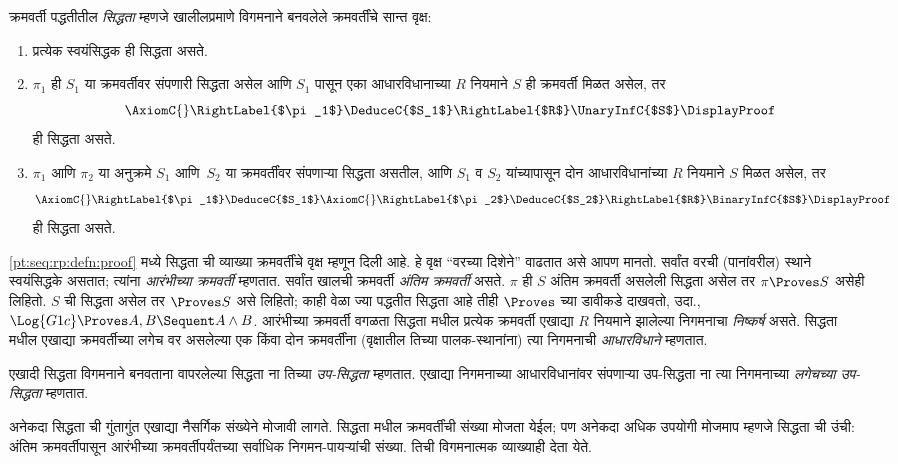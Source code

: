 \begin{defn}\label{pt:seq:rp:defn:proof}
क्रमवर्ती पद्धतीतील \emph{सिद्धता} म्हणजे खालीलप्रमाणे
विगमनाने बनवलेले क्रमवर्तींचे सान्त वृक्ष:
\begin{enumerate}
  \item\label{pt:seq:rp:defn:prf:axiom} प्रत्येक स्वयंसिद्धक ही सिद्धता असते.
  \item\label{pt:seq:rp:defn:prf:one-prem} $\pi_1$ ही $S_1$ या क्रमवर्तीवर
  संपणारी सिद्धता असेल आणि $S_1$ पासून एका आधारविधानाच्या
  $R$ नियमाने $S$ ही क्रमवर्ती मिळत असेल, तर
  \[
  \AxiomC{}
  \RightLabel{$\pi_1$}
  \DeduceC{$S_1$}
  \RightLabel{$R$}
  \UnaryInfC{$S$}
  \DisplayProof
  \]
  ही सिद्धता असते.
  \item\label{pt:seq:rp:defn:prf:two-prem} $\pi_1$ आणि $\pi_2$ या
  अनुक्रमे $S_1$ आणि~$S_2$ या क्रमवर्तींवर संपणाऱ्या सिद्धता
  असतील, आणि $S_1$ व $S_2$ यांच्यापासून दोन आधारविधानांच्या $R$ नियमाने
  $S$ मिळत असेल, तर
  \[
  \AxiomC{}
  \RightLabel{$\pi_1$}
  \DeduceC{$S_1$}
  \AxiomC{}
  \RightLabel{$\pi_2$}
  \DeduceC{$S_2$}
  \RightLabel{$R$}
  \BinaryInfC{$S$}
  \DisplayProof
  \]
  ही सिद्धता असते.
\end{enumerate}
\end{defn}

\ref{pt:seq:rp:defn:proof} मध्ये सिद्धता ची व्याख्या क्रमवर्तींचे वृक्ष म्हणून
दिली आहे. हे वृक्ष ``वरच्या दिशेने'' वाढतात असे आपण मानतो.
सर्वांत वरची (पानांवरील) स्थाने स्वयंसिद्धके असतात; त्यांना
\emph{आरंभीच्या क्रमवर्ती} म्हणतात. सर्वांत खालची क्रमवर्ती
\emph{अंतिम क्रमवर्ती} असते. $\pi$ ही $S$ अंतिम क्रमवर्ती
असलेली सिद्धता असेल तर $\pi \Proves S$ असेही लिहितो.
$S$ ची सिद्धता असेल तर $\Proves S$ असे लिहितो; काही वेळा
ज्या पद्धतीत सिद्धता आहे तीही $\Proves$ च्या डावीकडे दाखवतो,
उदा., $\Log{G1c} \Proves A, B \Sequent A \land
B$. आरंभीच्या क्रमवर्ती वगळता सिद्धता मधील प्रत्येक
क्रमवर्ती एखाद्या $R$ नियमाने झालेल्या निगमनाचा
\emph{निष्कर्ष} असते. सिद्धता मधील एखाद्या क्रमवर्तीच्या
लगेच वर असलेल्या एक किंवा दोन क्रमवर्तींना (वृक्षातील तिच्या
पालक-स्थानांना) त्या निगमनाची \emph{आधारविधाने} म्हणतात.

एखादी सिद्धता विगमनाने बनवताना वापरलेल्या सिद्धता ना तिच्या
\emph{उप-सिद्धता} म्हणतात. एखाद्या निगमनाच्या आधारविधानांवर
संपणाऱ्या उप-सिद्धता ना त्या निगमनाच्या \emph{लगेचच्या
उप-सिद्धता} म्हणतात.

अनेकदा सिद्धता ची गुंतागुंत एखाद्या नैसर्गिक संख्येने
मोजावी लागते. सिद्धता मधील क्रमवर्तींची संख्या मोजता येईल;
पण अनेकदा अधिक उपयोगी मोजमाप म्हणजे सिद्धता ची उंची:
अंतिम क्रमवर्तीपासून आरंभीच्या क्रमवर्तीपर्यंतच्या सर्वाधिक
निगमन-पायऱ्यांची संख्या. तिची विगमनात्मक व्याख्याही देता येते.

